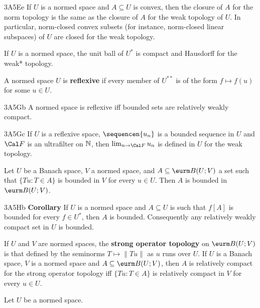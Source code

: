\spheader 3A5Ee If $U$ is a normed space and $A\subseteq U$ is convex,
then the closure of $A$ for the norm topology is the same as the closure
of $A$ for the weak topology of $U$.   In particular, norm-closed convex
subsets (for instance, norm-closed linear
subspaces) of $U$ are closed for the weak topology.

 If $U$ is a normed space,
the unit ball of $U^*$ is compact and Hausdorff for the weak*
topology.

 A normed space $U$ is
{\bf reflexive} if every member of $U^{**}$ is of the form
$f\mapsto f(u)$ for some $u\in U$.

\spheader 3A5Gb A normed space is reflexive iff bounded sets are
relatively weakly compact. 

\spheader 3A5Gc If $U$ is a reflexive space, $\sequencen{u_n}$ is a
bounded sequence in $U$ and $\Cal F$ is an ultrafilter on
$\Bbb N$, then $\lim_{n\to\Cal F}u_n$ is defined in $U$ for the weak
topology.

 Let $U$ be a Banach
space, $V$ a normed space, and $A\subseteq\eurm B(U;V)$ a set such that
$\{Tu:T\in A\}$ is bounded in $V$ for every $u\in U$.   Then $A$ is
bounded in $\eurm B(U;V)$.

\spheader 3A5Hb {\bf Corollary} If $U$ is a
normed space and $A\subseteq U$ is such that $f[A]$ is bounded for every
$f\in U^*$, then $A$ is bounded.
Consequently any relatively weakly compact set in $U$ is bounded.

If $U$ and $V$ are normed spaces,
the {\bf strong operator topology} on $\eurm B(U;V)$ is that defined by
the seminorms $T\mapsto\|Tu\|$ as $u$ runs over $U$.
If $U$ is a Banach space, $V$ is a normed space and
$A\subseteq\eurm B(U;V)$,
then $A$ is relatively compact for the strong operator topology
iff $\{Tu:T\in A\}$ is relatively compact in $V$ for every $u\in U$.

 Let $U$ be a normed space.

